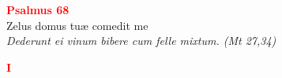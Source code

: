 


\def\greinitialformat#1{%
{\fontsize{39}{39}\selectfont #1}%
}




\vspace{0.3cm}
\begin{center}
 \textcolor{red}{\large \bf Psalmus 68}\\
Zelus domus tuæ comedit me\\
\textit{\small Dederunt ei vinum bibere cum felle mixtum. (Mt 27,34)}
\end{center}
\begin{center}
\textcolor{red}{\bf I}
\end{center}
